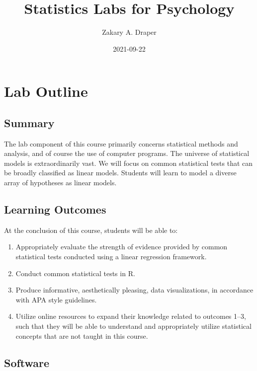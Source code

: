 \documentclass[
]{book}
\title{Statistics Labs for Psychology}
\author{Zakary A. Draper}
\date{2021-09-22}
\providecommand{\tightlist}{%
  \setlength{\itemsep}{0pt}\setlength{\parskip}{0pt}}
\begin{document}
\maketitle

{
\setcounter{tocdepth}{1}
\tableofcontents
}
\hypertarget{lab-outline}{%
\chapter*{Lab Outline}\label{lab-outline}}

\hypertarget{summary}{%
\section*{Summary}\label{summary}}

The lab component of this course primarily concerns statistical methods and analysis, and of course the use of computer programs. The universe of statistical models is extraordinarily vast. We will focus on common statistical tests that can be broadly classified as linear models. Students will learn to model a diverse array of hypotheses as linear models.

\hypertarget{learning-outcomes}{%
\section*{Learning Outcomes}\label{learning-outcomes}}

At the conclusion of this course, students will be able to:

\begin{enumerate}
\def\labelenumi{\arabic{enumi}.}
\tightlist
\item
  Appropriately evaluate the strength of evidence provided by common statistical tests conducted using a linear regression framework.
\item
  Conduct common statistical tests in R.
\item
  Produce informative, aesthetically pleasing, data visualizations, in accordance with APA style guidelines.
\item
  Utilize online resources to expand their knowledge related to outcomes 1--3, such that they will be able to understand and appropriately utilize statistical concepts that are not taught in this course.
\end{enumerate}

\hypertarget{software}{%
\section*{Software}\label{software}}
\end{document}
